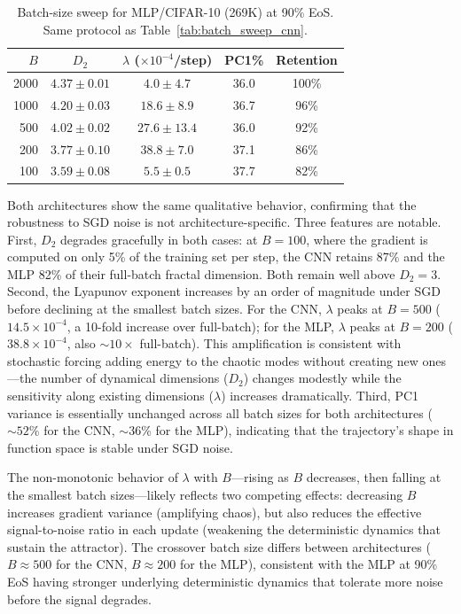\documentclass[aps,prl,twocolumn,superscriptaddress]{revtex4-2}
\begin{document}
\begin{table}[h]
\caption{\label{tab:batch_sweep_mlp}%
Batch-size sweep for MLP/CIFAR-10 (269K) at 90\% EoS. Same protocol as Table~\ref{tab:batch_sweep_cnn}.}
\begin{ruledtabular}
\begin{tabular}{rcccc}
$B$ & $D_2$ & $\lambda$ ($\times 10^{-4}$/step) & PC1\% & Retention\\
\hline
2000 & $4.37 \pm 0.01$ & $4.0 \pm 4.7$ & 36.0 & 100\%\\
1000 & $4.20 \pm 0.03$ & $18.6 \pm 8.9$ & 36.7 & 96\%\\
500 & $4.02 \pm 0.02$ & $27.6 \pm 13.4$ & 36.0 & 92\%\\
200 & $3.77 \pm 0.10$ & $38.8 \pm 7.0$ & 37.1 & 86\%\\
100 & $3.59 \pm 0.08$ & $5.5 \pm 0.5$ & 37.7 & 82\%\\
\end{tabular}
\end{ruledtabular}
\end{table}

Both architectures show the same qualitative behavior, confirming that the robustness to SGD noise is not architecture-specific. Three features are notable. First, $D_2$ degrades gracefully in both cases: at $B = 100$, where the gradient is computed on only 5\% of the training set per step, the CNN retains 87\% and the MLP 82\% of their full-batch fractal dimension. Both remain well above $D_2 = 3$. Second, the Lyapunov exponent increases by an order of magnitude under SGD before declining at the smallest batch sizes. For the CNN, $\lambda$ peaks at $B = 500$ ($14.5 \times 10^{-4}$, a 10-fold increase over full-batch); for the MLP, $\lambda$ peaks at $B = 200$ ($38.8 \times 10^{-4}$, also ${\sim}10\times$ full-batch). This amplification is consistent with stochastic forcing adding energy to the chaotic modes without creating new ones---the number of dynamical dimensions ($D_2$) changes modestly while the sensitivity along existing dimensions ($\lambda$) increases dramatically. Third, PC1 variance is essentially unchanged across all batch sizes for both architectures (${\sim}52$\% for the CNN, ${\sim}36$\% for the MLP), indicating that the trajectory's shape in function space is stable under SGD noise.

The non-monotonic behavior of $\lambda$ with $B$---rising as $B$ decreases, then falling at the smallest batch sizes---likely reflects two competing effects: decreasing $B$ increases gradient variance (amplifying chaos), but also reduces the effective signal-to-noise ratio in each update (weakening the deterministic dynamics that sustain the attractor). The crossover batch size differs between architectures ($B \approx 500$ for the CNN, $B \approx 200$ for the MLP), consistent with the MLP at 90\% EoS having stronger underlying deterministic dynamics that tolerate more noise before the signal degrades.
\end{document}
